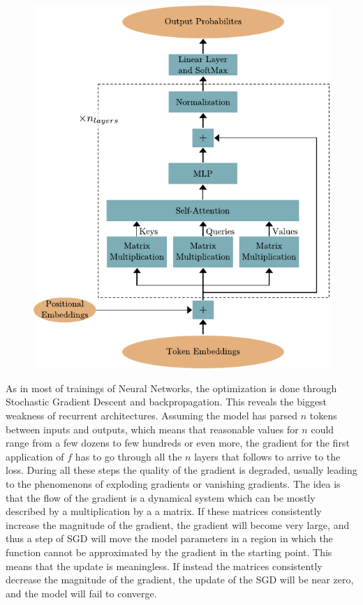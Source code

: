\documentclass[]{marticle}
\begin{document}
\begin{figure}[!h] 
\begin{center}
\includegraphics{transformer_architecture.pdf}
\caption{} 
\end{center}
\end{figure}

As in most of trainings of Neural Networks, the optimization is done through Stochastic Gradient
Descent and backpropagation. This reveals the biggest weakness of recurrent architectures. Assuming
the model has parsed $n$ tokens between inputs and outputs, which means that reasonable values for
$n$ could range from a few dozens to few hundreds or even more, the gradient for the first
application of $f$ has to go through all the $n$ layers that follows to arrive to the loss. During
all these steps the quality of the gradient is degraded, usually leading to the phenomenons of
exploding gradients or vanishing gradients. The idea is that the flow of the gradient is a dynamical
system which can be mostly described by a multiplication by a a matrix. If these matrices
consistently increase the magnitude of the gradient, the gradient will become very large, and thus a
step of SGD will move the model parameters in a region in which the function cannot be approximated
by the gradient in the starting point. This means that the update is meaningless. If instead the
matrices consistently decrease the magnitude of the gradient, the update of the SGD will be near
zero, and the model will fail to converge.
\end{document}
